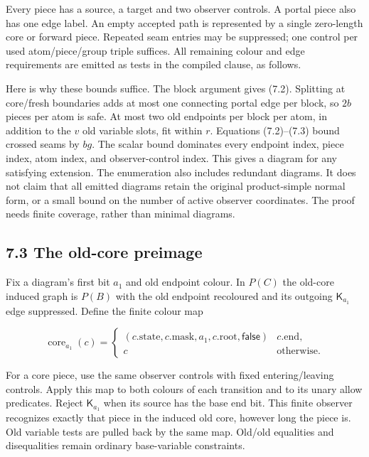 \documentclass[
  11pt,
  a4paper,
]{article}
\begin{document}
Every piece has a source, a target and two observer controls. A portal
piece also has one edge label. An empty accepted path is represented by
a single zero-length core or forward piece. Repeated seam entries may be
suppressed; one control per used atom/piece/group triple suffices. All
remaining colour and edge requirements are emitted as tests in the
compiled clause, as follows.

Here is why these bounds suffice. The block argument gives (7.2).
Splitting at core/fresh boundaries adds at most one connecting portal
edge per block, so \(2b\) pieces per atom is safe. At most two old
endpoints per block per atom, in addition to the \(v\) old variable
slots, fit within \(r\). Equations (7.2)--(7.3) bound crossed seams by
\(bg\). The scalar bound dominates every endpoint index, piece index,
atom index, and observer-control index. This gives a diagram for any
satisfying extension. The enumeration also includes redundant diagrams.
It does not claim that all emitted diagrams retain the original
product-simple normal form, or a small bound on the number of active
observer coordinates. The proof needs finite coverage, rather than
minimal diagrams.

\subsection{7.3 The old-core preimage}\label{the-old-core-preimage}

Fix a diagram's first bit \(a_1\) and old endpoint colour. In \(P(C)\)
the old-core induced graph is \(P(B)\) with the old endpoint recoloured
and its outgoing \(\mathsf K_{a_1}\) edge suppressed. Define the finite
colour map

\[\operatorname{core}_{a_1}(c)=
\begin{cases}
(c.\mathrm{state},c.\mathrm{mask},a_1,c.\mathrm{root},\mathsf{false})
&c.\mathrm{end},\\
c&\text{otherwise}.
\end{cases}\]

For a core piece, use the same observer controls with fixed
entering/leaving controls. Apply this map to both colours of each
transition and to its unary allow predicates. Reject \(\mathsf K_{a_1}\)
when its source has the base end bit. This finite observer recognizes
exactly that piece in the induced old core, however long the piece is.
Old variable tests are pulled back by the same map. Old/old equalities
and disequalities remain ordinary base-variable constraints.
\end{document}
